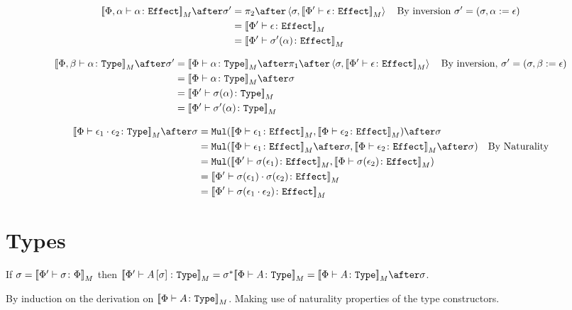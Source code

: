 \documentclass{report}
\begin{document}
\begin{align}
    \deno{\typerelation{\P,\a}{\a}{\effect}}\after\si' &= \pp\after\pr{\si}{\deno{\typerelation{\P'}{\e}{\effect}}}\qt{By inversion $\si' = (\si, \a\setto\e)$}\\
    & =\deno{\typerelation{\P'}{\e}{\effect}} \\
    &= \deno{\typerelation{\P'}{\si'(\a)}{\effect}}\\
\end{align}

\begin{align}
    \deno{\typerelation{\P, \b}{\a}{\type}}\after\si' &= \deno{\typerelation{\P}{\a}{\type}} \after \p\after\pr{\si}{\deno{\typerelation{\P'}{\e}{\effect}}}\qt{By inversion, $\si' = (\si, \b\setto\e)$}\\
    & = \deno{\typerelation{\P}{\a}{\type}}\after\si\\
    & = \deno{\typerelation{\P'}{\si(\a)}{\type}}\\
    & = \deno{\typerelation{\P'}{\si'(\a)}{\type}}\\
\end{align}

\begin{align}
    \deno{\typerelation{\P}{\e_1\dot\e_2}{\type}} \after\si &=
    \Mul(\deno{\typerelation{\P}{\e_1}{\effect}}, \deno{\typerelation{\P}{\e_2}{\effect}})\after \si \\
    & = \Mul(\deno{\typerelation{\P}{\e_1}{\effect}}\after \si, \deno{\typerelation{\P}{\e_2}{\effect}}\after \si)\qt{By Naturality}\\
    & = \Mul(\deno{\typerelation{\P'}{\si(\e_1)}{\effect}}, \deno{\typerelation{\P}{\si(\e_2)}{\effect}})\\
    & = \deno{\typerelation{\P'}{\si(\e_1)\dot\si(\e_2)}{\effect}}\\
    & = \deno{\typerelation{\P'}{\si(\e_1\dot\e_2)}{\effect}}\\
\end{align}

\section{Types}
If $\sigma = {\bf [\![}\Phi' \vdash \sigma \colon \Phi{\bf ]\!]}_M$ then $\deno{\typerelation{\P'}{A\ssi}{\type}} = \si\star\deno{\typerelation{\P}{A}{\type}} = \deno{\typerelation{\P}{A}{\type}}\after\si$.

\proof
By induction on the derivation on ${\bf [\![}\Phi \vdash A \colon \texttt{Type}{\bf ]\!]}_M$. Making use of naturality properties of the type constructors.
\end{document}
